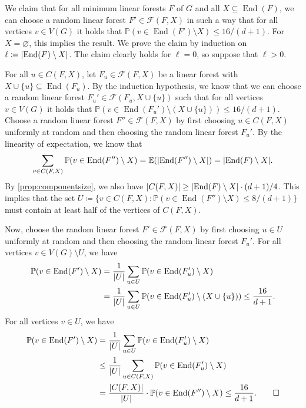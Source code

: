 \documentclass[10pt,a4paper]{amsart}
\makeatletter
\DeclareMathOperator{\End}{End}
\DeclarePairedDelimiter{\abs}{\lvert}{\rvert}
\newcommand{\cF}{\mathcal F}
\let\emptyset\varnothing
\newcommand{\ev}{\mathbb{E}}
\newcommand{\pr}{\mathbb{P}}
\renewenvironment{proof}[1][\proofname]
{\par\pushQED{\qed}
	\normalfont\topsep6\p@\@plus6\p@\relax\trivlist
	\item[\hskip\labelsep\bfseries#1\@addpunct{.}]
	\ignorespaces}
{\popQED\endtrivlist\@endpefalse}
\makeatother
\begin{document}
\begin{proof}
    We claim that for all minimum linear forests $F$ of $G$ and all $X \subseteq \End(F)$, we can choose a random linear forest $F' \in \cF(F,X)$ in such a way that for all vertices $v \in V(G)$ it holds that $\pr(v \in \End(F') \setminus X) \le 16/(d+1)$. For $X = \emptyset$, this implies the result. We prove the claim by induction on $\ell \coloneqq \abs{\End(F) \setminus X}$. The claim clearly holds for $\ell = 0$, so suppose that $\ell > 0$.

    For all $u \in C(F,X)$, let $F_u \in \cF(F,X)$ be a linear forest with $X \cup \{u\} \subseteq \End(F_u)$. By the induction hypothesis, we know that we can choose a random linear forest $F_u' \in \cF(F_u,X \cup \{u\})$ such that for all vertices $v \in V(G)$ it holds that $\pr(v \in \End(F_u') \setminus (X \cup \{u\})) \le 16/(d+1)$. Choose a random linear forest $F'' \in \cF(F,X)$ by first choosing $u \in C(F,X)$ uniformly at random and then choosing the random linear forest $F_u'$. By the linearity of expectation, we know that
    \[
        \sum_{v \in C(F,X)} \pr(v \in \End(F'') \setminus X) = \ev(\abs{\End(F'') \setminus X}) = \abs{\End(F) \setminus X}.
    \]
    By \cref{prop:componentsize}, we also have $\abs{C(F,X)} \ge \abs{\End(F) \setminus X} \cdot (d+1)/4$. This implies that the set $U \coloneqq \{v \in C(F,X) : \pr(v \in \End(F'') \setminus X) \le 8/(d+1)\}$ must contain at least half of the vertices of $C(F,X)$.

    Now, choose the random linear forest $F' \in \cF(F,X)$ by first choosing $u \in U$ uniformly at random and then choosing the random linear forest $F_u'$. For all vertices $v \in V(G) \setminus U$, we have
    \begin{align*}
        \pr(v \in \End(F') \setminus X) & = \frac{1}{\abs{U}} \sum_{u \in U} \pr(v \in \End(F_u') \setminus X) \\
        & = \frac{1}{\abs{U}} \sum_{u \in U} \pr(v \in \End(F_u') \setminus (X \cup \{u\})) \le \frac{16}{d+1}.
    \end{align*}
    For all vertices $v \in U$, we have
    \begin{align*}
        \pr(v \in \End(F') \setminus X) & = \frac{1}{\abs{U}} \sum_{u \in U} \pr(v \in \End(F_u') \setminus X) \\
        & \le \frac{1}{\abs{U}} \sum_{u \in C(F,X)} \pr(v \in \End(F_u') \setminus X) \\
        & = \frac{\abs{C(F,X)}}{\abs{U}} \cdot \pr(v \in \End(F'') \setminus X) \le \frac{16}{d+1}. \qedhere
    \end{align*}
\end{proof}
\end{document}

